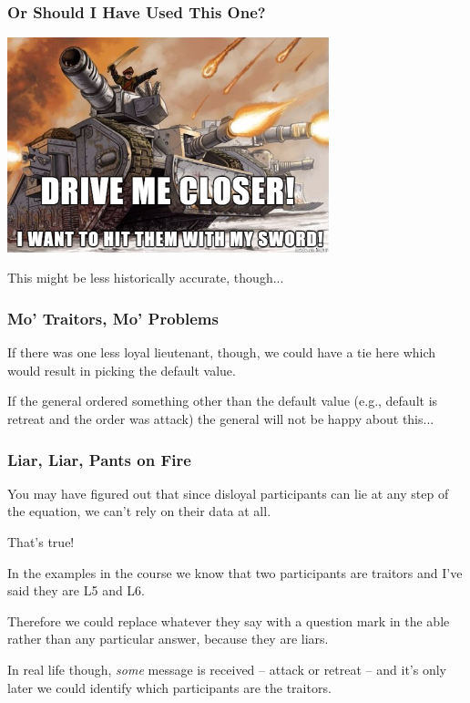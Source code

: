 \begin{frame}
	\frametitle{Or Should I Have Used This One?}

	\begin{center}
		\includegraphics[width=0.7\textwidth]{images/warhammer.png}
	\end{center}

	This might be less historically accurate, though...

\end{frame}


\begin{frame}
	\frametitle{Mo' Traitors, Mo' Problems}

	If there was one less loyal lieutenant, though, we could have a tie here which would result in picking the default value.

	If the general ordered something other than the default value (e.g., default is retreat and the order was attack) the general will not be happy about this...

\end{frame}

\begin{frame}
	\frametitle{Liar, Liar, Pants on Fire}

	You may have figured out that since disloyal participants can lie at any step of the equation, we can't rely on their data at all.

	That's true!

	In the examples in the course we know that two participants are traitors and I've said they are L5 and L6.

	Therefore we could replace whatever they say with a question mark in the able rather than any particular answer, because they are liars.

	In real life though, \textit{some} message is received -- attack or retreat -- and it's only later we could identify which participants are the traitors.
\end{frame}


